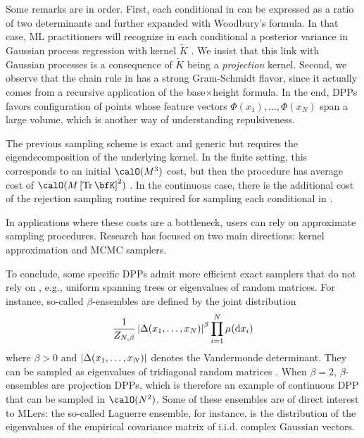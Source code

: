 \documentclass[twoside,11pt]{article}
\begin{document}
      Some remarks are in order.
      First, each conditional in  can be expressed as a ratio of two determinants and further expanded with Woodbury's formula.
      In that case, ML practitioners will recognize in each conditional a posterior variance in Gaussian process regression with kernel $\tilde K$ \cite[Equation 2.26]{RaWi06}. We insist that this link with Gaussian processes is a consequence of $\tilde K$ being a \emph{projection} kernel.
      Second, we observe that the chain rule in  has a strong Gram-Schmidt flavor, since it actually comes from a recursive application of the base$\times$height formula.
      In the end, DPPs favors configuration of points whose feature vectors $\Phi(x_1),\dots, \Phi(x_N)$ span a large volume, which is another way of understanding repulsiveness.

      The previous sampling scheme is exact and generic but requires the eigendecomposition of the underlying kernel.
      In the finite setting, this corresponds to an initial $\calO(M^3)$ cost, but then the procedure has average cost of $\calO(M\lrb{\Tr \bfK}^2)$
      \citep{TrBaAm18}.
      In the continuous case, there is the additional cost of the rejection sampling routine required for sampling each conditional in .

      In applications where these costs are a bottleneck, users can rely on approximate sampling procedures. Research has focused on two main directions: kernel approximation and MCMC samplers.

      To conclude, some specific DPPs admit more efficient exact samplers that do not rely on , e.g., uniform spanning trees \citep{PrWi98} or eigenvalues of random matrices. For instance, so-called $\beta$-ensembles are defined by the joint distribution
      \begin{equation*}
        \frac{1}{Z_{N,\beta}}
        \left| \Delta(x_1,\dots,x_N) \right|^{\beta}
        \prod_{i= 1}^N
          \mu(\mathop{}\!\mathrm{d} x_i)
      \end{equation*}
      where $\beta>0$ and $\left| \Delta(x_1,\dots,x_N) \right|$ denotes the Vandermonde determinant. They can be sampled as eigenvalues of tridiagonal random matrices \citep{DuEd02}. When $\beta=2$, $\beta$-ensembles are projection DPPs, which is therefore an example of continuous DPP that can be sampled in $\calO(N^2)$. Some of these ensembles are of direct interest to MLers: the so-called Laguerre ensemble, for instance, is the distribution of the eigenvalues of the empirical covariance matrix of i.i.d. complex Gaussian vectors.
\end{document}
